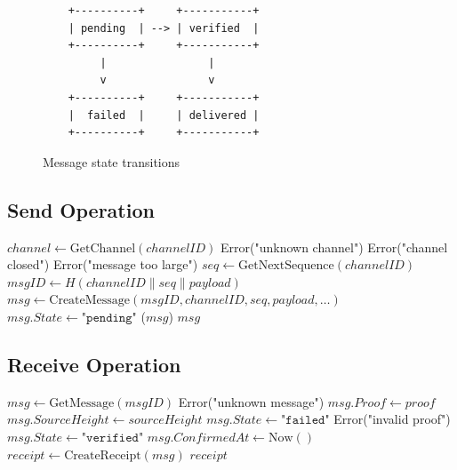 \documentclass[11pt,twocolumn]{article}
\begin{document}
\begin{figure}[h]
\centering
\begin{verbatim}
    +----------+     +-----------+
    | pending  | --> | verified  |
    +----------+     +-----------+
         |                |
         v                v
    +----------+     +-----------+
    |  failed  |     | delivered |
    +----------+     +-----------+
\end{verbatim}
\caption{Message state transitions}
\end{figure}

\subsection{Send Operation}

\begin{algorithm}
\caption{Send Message}
\label{alg:send-message}
\begin{algorithmic}[1]
    \State $channel \gets \text{GetChannel}(channelID)$
        \State \Return Error("unknown channel")
    \EndIf
        \State \Return Error("channel closed")
    \EndIf
        \State \Return Error("message too large")
    \EndIf
    \State $seq \gets \text{GetNextSequence}(channelID)$
    \State $msgID \gets H(channelID \| seq \| payload)$
    \State $msg \gets \text{CreateMessage}(msgID, channelID, seq, payload, \ldots)$
    \State $msg.State \gets \texttt{"pending"}$
    \State {}($msg$)
    \State \Return $msg$
\EndProcedure
\end{algorithmic}
\end{algorithm}

\subsection{Receive Operation}

\begin{algorithm}
\caption{Receive Message}
\label{alg:receive-message}
\begin{algorithmic}[1]
    \State $msg \gets \text{GetMessage}(msgID)$
        \State \Return Error("unknown message")
    \EndIf
    \State $msg.Proof \gets proof$
    \State $msg.SourceHeight \gets sourceHeight$
        \State $msg.State \gets \texttt{"failed"}$
        \State \Return Error("invalid proof")
    \EndIf
    \State $msg.State \gets \texttt{"verified"}$
    \State $msg.ConfirmedAt \gets \text{Now}()$
    \State $receipt \gets \text{CreateReceipt}(msg)$
    \State \Return $receipt$
\EndProcedure
\end{algorithmic}
\end{algorithm}
\end{document}

